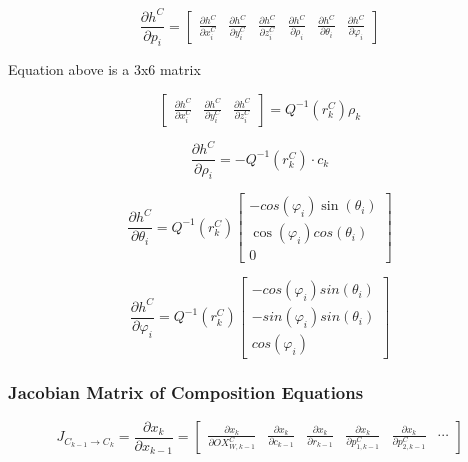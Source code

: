 \begin{equation}
\frac{\partial h^{C}}{\partial p_{i}}=\begin{bmatrix}
\frac{\partial h^{C}}{\partial x_{i}^{C}} & 
\frac{\partial h^{C}}{\partial y_{i}^{C}} & 
\frac{\partial h^{C}}{\partial z_{i}^{C}} & 
\frac{\partial h^{C}}{\partial \rho _{i}} &
\frac{\partial h^{C}}{\partial \theta _{i}} &
\frac{\partial h^{C}}{\partial \varphi _{i}}
\end{bmatrix}
\end{equation}

Equation above is a 3x6 matrix

\begin{equation}
\begin{bmatrix}
\frac{\partial h^{C}}{\partial x_{i}^{C}} & 
\frac{\partial h^{C}}{\partial y_{i}^{C}} & 
\frac{\partial h^{C}}{\partial z_{i}^{C}}
\end{bmatrix}
 =Q^{-1}(r_{k}^{C})\rho _{k}
\end{equation}


\begin{equation}
\frac{\partial h^{C}}{\partial \rho _{i}}=-Q^{-1}(r_{k}^{C})\cdot c_{k}
\end{equation}


\begin{equation}
\frac{\partial h^{C}}{\partial \theta _{i}}=
Q^{-1}(r_{k}^{C}) \begin{bmatrix}
-cos(\varphi _{i})\sin(\theta _{i}) \\
\cos (\varphi _{i})cos(\theta _{i}) \\
0 \end{bmatrix}
\end{equation}

\begin{equation}
\frac{\partial h^{C}}{\partial \varphi _{i}}= 
Q^{-1}(r_{k}^{C}) \begin{bmatrix}
-cos(\varphi _{i})sin(\theta _{i}) \\
-sin(\varphi _{i})sin(\theta _{i}) \\
cos(\varphi _{i})
\end{bmatrix}
\end{equation}

\subsubsection{Jacobian Matrix of Composition Equations}

\begin{equation}
J_{C_{k-1}\to C_{k}}=\frac{\partial x_{k}}{\partial x_{k-1}}=\begin{bmatrix}
\frac{\partial x_{k}}{\partial OX_{W, k-1}^{C}} &
\frac{\partial x_{k}}{\partial c_{k-1}} & 
\frac{\partial x_{k}}{\partial r_{k-1}} & 
\frac{\partial x_{k}}{\partial p_{1, k-1}^{C}} &
\frac{\partial x_{k}}{\partial p_{2, k-1}^{C}} &
\cdots 
\end{bmatrix}
\end{equation}

